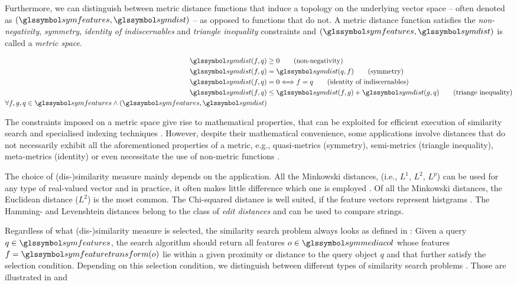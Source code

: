 Furthermore, we can distinguish between metric distance functions that induce a topology on the underlying vector space -- often denoted as $(\symfeatures, \symdist)$ -- as opposed to functions that do not. A metric distance function satisfies the \emph{non-negativity}, \emph{symmetry}, \emph{identity of indiscernables} and \emph{triangle inequality} constraints and $(\symfeatures, \symdist)$ is called a \emph{metric space}. 

\begin{align}
  \label{eq:metric}
   \symdist(f,q) &\geq 0                           \tag{non-negativity} \\
   \symdist(f,q) &= \symdist(q,f)                    \tag{symmetry}\\
   \symdist(f,q) &= 0 \Longleftrightarrow f = q    \tag{identity of indiscernables}\\
   \symdist(f,q) &\leq  \symdist(f,g) +  \symdist(g,q)   \tag{triange inequality}\\
   \forall f,g,q \in \symfeatures \wedge (\symfeatures, \symdist) \nonumber
\end{align}

The constraints imposed on a metric space give rise to mathematical properties, that can be exploited for efficient execution of similarity search and specialised indexing techniques \cite{Zezula:2006Similarity}. However, despite their mathematical convenience, some applications involve distances that do not necessarily exhibit all the aforementioned properties of a metric, e.g., quasi-metrics (symmetry), semi-metrics (triangle inequality), meta-metrics (identity) \cite{Zezula:2006Similarity} or even necessitate the use of non-metric functions \cite{Skopal:2011Nonmetric}.

The choice of (dis-)similarity measure mainly depends on the application. All the Minkowski distances, (i.e., $L^1$, $L^2$, $L^p$) can be used for any type of real-valued vector and in practice, it often makes little difference which one is employed \cite{Rossetto:2018thesis}. Of all the Minkowski distances, the Euclidean distance ($L^2$) is the most common. The Chi-squared distance is well suited, if the feature vectors represent histgrams \cite{Pele:2010Quadratic}. The Hamming- and Levenshtein distances belong to the class of \emph{edit distances} and can be used to compare strings.

Regardless of what (dis-)similarity measure is selected, the similarity search problem always looks as defined in : Given a query $q \in \symfeatures$, the search algorithm should return all features $o \in \symmediacol$ whose features $f = \symfeaturetransform(o)$ lie within a given proximity or distance to the query object $q$ and that further satisfy the selection condition. Depending on this selection condition, we distinguish between different types of similarity search problems \cite{Zezula:2006Similarity}. Those are illustrated in  and 

